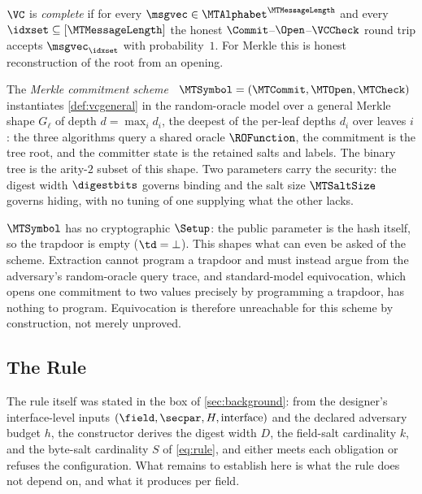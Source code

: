 \begin{definition}[Completeness]\label{def:vc-complete}
$\VC$ is \emph{complete} if for every $\msgvec\in\MTAlphabet^{\MTMessageLength}$
and every $\idxset\subseteq[\MTMessageLength]$ the honest
$\Commit$--$\Open$--$\VCCheck$ round trip accepts $\msgvec_{\idxset}$ with
probability~$1$.  For Merkle this is honest reconstruction of the root from an
opening.
\end{definition}

\begin{definition}\label{def:vc}
The \emph{Merkle commitment scheme}~\cite{Merkle88}
$\MTSymbol=(\MTCommit,\allowbreak\MTOpen,\allowbreak\MTCheck)$
instantiates \cref{def:vcgeneral} in the random-oracle model over a general
Merkle shape $G_\ell$ of depth $d=\max_i d_i$, the deepest of the per-leaf depths
$d_i$ over leaves $i$: the three algorithms query a
shared oracle $\ROFunction$, the commitment is the tree root, and the committer
state is the retained salts and labels.  The binary tree is the arity-$2$ subset
of this shape.  Two parameters carry the security: the digest
width $\digestbits$ governs binding and the salt size $\MTSaltSize$ governs
hiding, with no tuning of one supplying what the other lacks.
\end{definition}

\begin{limitation}
\label{lim:no-trapdoor}
$\MTSymbol$ has no cryptographic $\Setup$: the public parameter is the hash
itself, so the trapdoor is empty ($\td=\bot$).  This shapes what can even be
asked of the scheme.  Extraction cannot program a trapdoor and must instead
argue from the adversary's random-oracle query trace, and standard-model
equivocation, which opens one commitment to two values precisely by
programming a trapdoor, has nothing to program.  Equivocation is therefore
unreachable for this scheme by construction, not merely unproved.
\end{limitation}

\subsection{The Rule}
\label{sec:rule}

The rule itself was stated in the box of \cref{sec:background}: from the
designer's interface-level inputs $(\field,\secpar,H,\text{interface})$ and
the declared adversary budget $h$, the constructor
derives the digest width $D$, the field-salt cardinality $k$, and the byte-salt
cardinality $S$ of \cref{eq:rule}, and either meets each obligation or refuses
the configuration.  What remains to establish here is what the rule does not
depend on, and what it produces per field.

